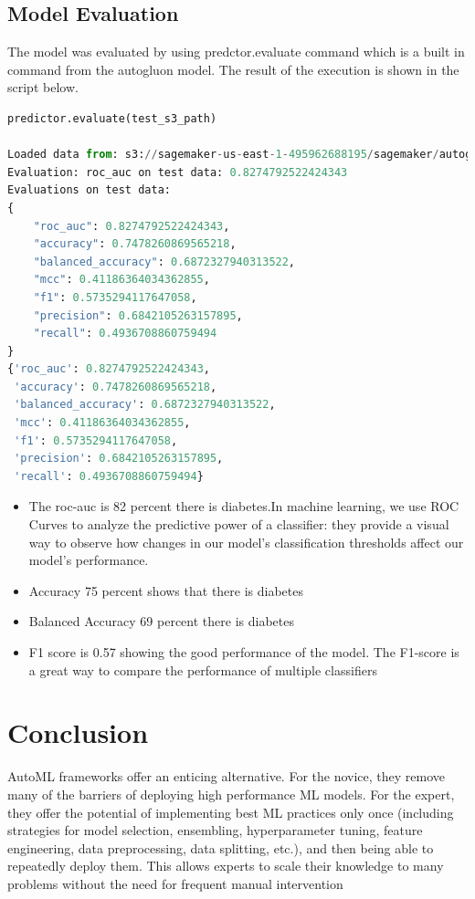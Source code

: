\documentclass[
]{article}
\begin{document}
\hypertarget{model-evaluation}{%
\subsection{Model Evaluation}\label{model-evaluation}}

The model was evaluated by using predctor.evaluate command which is a
built in command from the autogluon model. The result of the execution
is shown in the script below.

\begin{lstlisting}[language=python]
predictor.evaluate(test_s3_path)

Loaded data from: s3://sagemaker-us-east-1-495962688195/sagemaker/autogluon-tabular/data/test.csv | Columns = 9 / 9 | Rows = 230 -> 230
Evaluation: roc_auc on test data: 0.8274792522424343
Evaluations on test data:
{
    "roc_auc": 0.8274792522424343,
    "accuracy": 0.7478260869565218,
    "balanced_accuracy": 0.6872327940313522,
    "mcc": 0.41186364034362855,
    "f1": 0.5735294117647058,
    "precision": 0.6842105263157895,
    "recall": 0.4936708860759494
}
{'roc_auc': 0.8274792522424343,
 'accuracy': 0.7478260869565218,
 'balanced_accuracy': 0.6872327940313522,
 'mcc': 0.41186364034362855,
 'f1': 0.5735294117647058,
 'precision': 0.6842105263157895,
 'recall': 0.4936708860759494}
\end{lstlisting}

\begin{itemize}
\item
  The roc-auc is 82 percent there is diabetes.In machine learning, we
  use ROC Curves to analyze the predictive power of a classifier: they
  provide a visual way to observe how changes in our model's
  classification thresholds affect our model's performance.
\item
  Accuracy 75 percent shows that there is diabetes
\item
  Balanced Accuracy 69 percent there is diabetes
\item
  F1 score is 0.57 showing the good performance of the model. The
  F1-score is a great way to compare the performance of multiple
  classifiers
\end{itemize}

\hypertarget{conclusion}{%
\section{Conclusion}\label{conclusion}}

AutoML frameworks offer an enticing alternative. For the novice, they
remove many of the barriers of deploying high performance ML models. For
the expert, they offer the potential of implementing best ML practices
only once (including strategies for model selection, ensembling,
hyperparameter tuning, feature engineering, data preprocessing, data
splitting, etc.), and then being able to repeatedly deploy them. This
allows experts to scale their knowledge to many problems without the
need for frequent manual intervention
\end{document}
